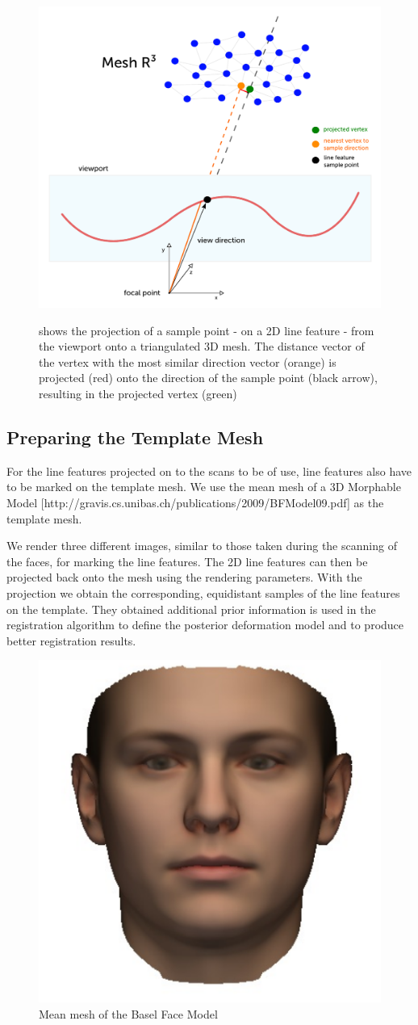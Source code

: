 \begin{figure}[h!]
    \includegraphics[width=\textwidth]{./resources/figures/projection.pdf}
\label{fig:projection}
\caption{shows the projection of a sample point - on a 2D line feature - from the viewport onto a triangulated 3D mesh. The distance vector of the vertex with the most similar direction vector (orange) is projected (red) onto the direction of the sample point (black arrow), resulting in the projected vertex (green)}
\end{figure}
\subsection{Preparing the Template Mesh}
For the line features projected on to the scans to be of use, line features also have to be marked on the template mesh. We use the mean mesh of a 3D Morphable Model [http://gravis.cs.unibas.ch/publications/2009/BFModel09.pdf] as the template mesh.

We render three different images, similar to those taken during the scanning of the faces, for marking the line features.
The 2D line features can then be projected back onto the mesh using the rendering parameters. With the projection we obtain the corresponding, equidistant samples of the line features on the template. They obtained additional prior information is used in the registration algorithm to define the posterior deformation model and to produce better registration results.
\begin{figure}[h!]
    \centering
    \includegraphics[width=.3\textwidth]{./resources/img/mean_msh.pdf}
    \caption{Mean mesh of the Basel Face Model}
\end{figure}


